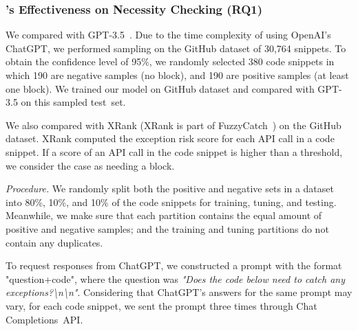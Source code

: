 \subsubsection{{\xblock}'s Effectiveness on  Necessity Checking (RQ1)}
 We compared {\xblock} with
GPT-3.5~\cite{ChatGPT}. Due to the time complexity of using OpenAI's ChatGPT, we
performed sampling on the GitHub dataset of 30,764 snippets. To obtain
the confidence level of 95\%, we randomly selected 380 code snippets
in which 190 are negative samples (no  block), and 190
are positive samples (at least one  block). We trained
our model on GitHub dataset and compared with GPT-3.5 on this sampled
test~set.

We also compared {\xblock} with XRank (XRank is part of
FuzzyCatch~\cite{xrank-fse20}) on the GitHub dataset. XRank computed
the exception risk score for each API call in a code snippet. If a
score of an API call in the code snippet is higher than a threshold, we consider
the case as needing a  block.

{\em Procedure.} We randomly split both the positive and negative sets
in a dataset into 80\%, 10\%, and 10\% of the code
snippets for training, tuning, and testing. Meanwhile, we make sure
that each partition contains the equal amount of positive and
negative samples; and the training and tuning partitions do not
contain any duplicates.

To request responses from ChatGPT, we constructed a prompt with the
format "question+code", where the question was {\em "Does the code
below need to catch any exceptions?\textbackslash n\textbackslash n"}.
Considering that ChatGPT's answers for the same prompt may vary, for
each code snippet, we sent the prompt three times through Chat
Completions~API.


